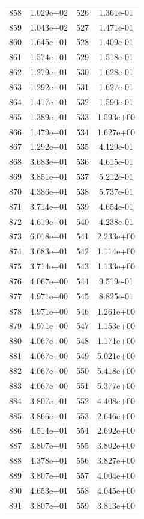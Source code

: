 \documentclass[12pt]{article}
\begin{document}
\begin{longtable}{@{}cccc@{}}
858 & 1.029e+02 & 526 & 1.361e-01 \\
859 & 1.043e+02 & 527 & 1.471e-01 \\
860 & 1.645e+01 & 528 & 1.409e-01 \\
861 & 1.574e+01 & 529 & 1.518e-01 \\
862 & 1.279e+01 & 530 & 1.628e-01 \\
863 & 1.292e+01 & 531 & 1.627e-01 \\
864 & 1.417e+01 & 532 & 1.590e-01 \\
865 & 1.389e+01 & 533 & 1.593e+00 \\
866 & 1.479e+01 & 534 & 1.627e+00 \\
867 & 1.292e+01 & 535 & 4.129e-01 \\
868 & 3.683e+01 & 536 & 4.615e-01 \\
869 & 3.851e+01 & 537 & 5.212e-01 \\
870 & 4.386e+01 & 538 & 5.737e-01 \\
871 & 3.714e+01 & 539 & 4.654e-01 \\
872 & 4.619e+01 & 540 & 4.238e-01 \\
873 & 6.018e+01 & 541 & 2.233e+00 \\
874 & 3.683e+01 & 542 & 1.114e+00 \\
875 & 3.714e+01 & 543 & 1.133e+00 \\
876 & 4.067e+00 & 544 & 9.519e-01 \\
877 & 4.971e+00 & 545 & 8.825e-01 \\
878 & 4.971e+00 & 546 & 1.261e+00 \\
879 & 4.971e+00 & 547 & 1.153e+00 \\
880 & 4.067e+00 & 548 & 1.171e+00 \\
881 & 4.067e+00 & 549 & 5.021e+00 \\
882 & 4.067e+00 & 550 & 5.418e+00 \\
883 & 4.067e+00 & 551 & 5.377e+00 \\
884 & 3.807e+01 & 552 & 4.408e+00 \\
885 & 3.866e+01 & 553 & 2.646e+00 \\
886 & 4.514e+01 & 554 & 2.692e+00 \\
887 & 3.807e+01 & 555 & 3.802e+00 \\
888 & 4.378e+01 & 556 & 3.827e+00 \\
889 & 3.807e+01 & 557 & 4.004e+00 \\
890 & 4.653e+01 & 558 & 4.045e+00 \\
891 & 3.807e+01 & 559 & 3.813e+00 \\

\end{longtable}
\end{document}
